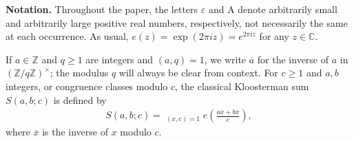 \documentclass[11pt,reqno]{amsart}
\newcommand{\bna}{\begin{eqnarray*}}
\newcommand{\ena}{\end{eqnarray*}}
\numberwithin{equation}{section}
\theoremstyle{plain}
\theoremstyle{definition}
\begin{document}
%
%
%
%
\medskip
\noindent\textbf{Notation.}
Throughout the paper, the letters
$\varepsilon$ and A denote arbitrarily small and arbitrarily large positive
real numbers, respectively, not necessarily the same at each occurrence.
As usual, $e(z) = \exp (2 \pi i z) = e^{2 \pi i z}$ for any $z\in\mathbb{C}$.

If $a\in\mathbb{Z}$ and $q\geq 1$ are integers and $(a,q)=1$, we write
$\overline{a}$ for the inverse of $a$ in $(\mathbb{Z}/q\mathbb{Z})^\times$;
the modulus $q$ will always be clear from context. 
For $c\geq 1$ and $a,b$ integers, or congruence classes modulo $c$, the classical Kloosterman sum $S(a,b;c)$
is defined by
\bna
S(a,b;c)=\mathop{\sum_{x\bmod c}}_{(x,c)=1}e\left(\frac{ax+b\overline{x}}{c}\right),
\ena
where $\overline{x}$ is the inverse of $x$ modulo $c$.
\end{document}
